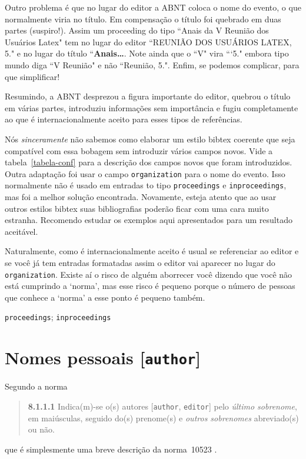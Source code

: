\documentclass[espacosimples]{abnt}
\begin{document}
Outro problema é que no lugar do editor a ABNT coloca o nome do evento, o que
normalmente viria no título. Em compensação o título foi quebrado em duas partes
(suspiro!). Assim um proceeding do tipo ``Anais da V Reunião dos Usuários Latex"
tem no lugar do editor ``REUNIÃO DOS USUÁRIOS LATEX, 5." e no lugar
do título ``{\bf Anais\ldots}. Note ainda que o ``V" vira ```5." embora
tipo mundo diga ``V Reunião" e não ``Reunião, 5.".
Enfim, se podemos complicar, para que simplificar!

Resumindo, a ABNT desprezou a figura importante do editor, quebrou o título
em várias partes, introduziu informações sem importância e fugiu completamente
ao que é internacionalmente aceito para esses tipos de referências.

Nós \emph{sinceramente} não sabemos como elaborar um estilo bibtex coerente que seja
compatível com essa bobagem sem introduzir vários campos novos.
Vide a tabela~\ref{tabela-conf} para a descrição dos campos novos que
foram introduzidos.
Outra adaptação foi usar o campo {\tt organization} para
o nome do evento. Isso normalmente não é usado em entradas to tipo
{\tt proceedings} e {\tt inproceedings}, mas foi a melhor solução encontrada.
Novamente, esteja atento que ao usar outros estilos bibtex suas bibliografias
poderão ficar com uma cara muito estranha. Recomendo estudar os exemplos
aqui apresentados para um resultado aceitável.

Naturalmente, como é internacionalmente aceito é usual se referenciar ao
editor e se você já tem entradas formatadas assim o editor vai aparecer
no lugar do {\tt organization}. Existe aí o risco de alguém aborrecer você
dizendo que você não está cumprindo a `norma', mas esse risco é pequeno
porque o número de pessoas que conhece a `norma' a esse ponto é
pequeno também.

{\tt proceedings}\cite{7.5.1.2-1,7.5.1.2-2,7.5.1.2-3,7.5.3-1,8.1.2.1-3};
{\tt inproceedings}\cite{7.5.2.2-1,7.5.2.2-2,7.5.2.2-3,7.5.3-2,7.5.3-3,7.5.3-4,7.5.3-5}

\section{Nomes pessoais [{\tt author}]}
\label{nome-pessoais}

Segundo a norma~\cite{NBR6023:2000}
\begin{quote}
{\bf 8.1.1.1}\cite{NBR6023:2000}
Indica(m)-se o(s) autores [{\tt author}, {\tt editor}]
pelo \emph{último sobrenome}, em maiúsculas, seguido
do(s) prenome(s) e \emph{outros sobrenomes} abreviado(s) ou não.
\cite{8.1.1.1-1,8.1.1.1-2}
\cite{8.1.1.1-1,8.1.1.1-2,8.1.1.1-3}
\end{quote}
que é simplesmente uma breve descrição da norma~10523 \cite{NBR10523:1988}.
\end{document}
